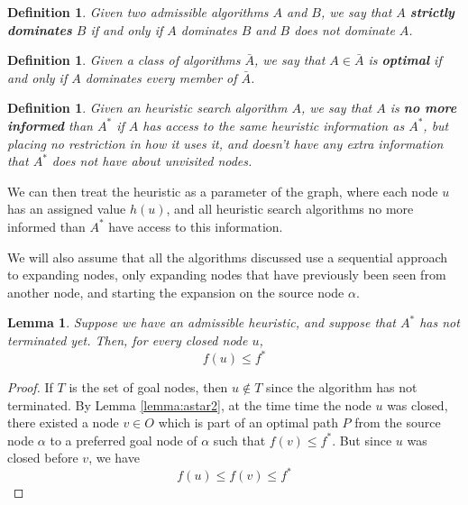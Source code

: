 \documentclass[12pt]{report}
\newtheorem{definition}[theorem]{Definition}
\newtheorem{lemma}[theorem]{Lemma}
\begin{document}
\begin{definition}
Given two admissible algorithms $A$ and $B$, we say that $A$ \textbf{strictly dominates} $B$ if and only if $A$ dominates $B$ and $B$ does not dominate $A$.
\end{definition}

\begin{definition}
Given a class of algorithms $\bar{A}$, we say that $A \in \bar{A}$ is \textbf{optimal} if and only if $A$ dominates every member of $\bar{A}$.
\end{definition}

\begin{definition}
Given an heuristic search algorithm $A$, we say that $A$ is \textbf{no more informed} than $A^*$ if $A$ has access to the same heuristic information as $A^*$, but placing no restriction in how it uses it, and doesn't have any extra information that $A^*$ does not have about unvisited nodes.
\end{definition}

We can then treat the heuristic as a parameter of the graph, where each node $u$ has an assigned value $h(u)$, and all heuristic search algorithms no more informed than $A^*$ have access to this information.

We will also assume that all the algorithms discussed use a sequential approach to expanding nodes, only expanding nodes that have previously been seen from another node, and starting the expansion on the source node $\alpha$.

\begin{lemma}
\label{lemma:astar-opt}
Suppose we have an admissible heuristic, and suppose that $A^*$ has not terminated yet. Then, for every closed node $u$,
\[ f(u) \leq f^* \]
\end{lemma}
\begin{proof}
If $T$ is the set of goal nodes, then $u \not \in T$ since the algorithm has not terminated. By Lemma \ref{lemma:astar2}, at the time time the node $u$ was closed, there existed a node $v \in O$ which is part of an optimal path $P$ from the source node $\alpha$ to a preferred goal node of $\alpha$ such that $f(v) \leq f^*$.
But since $u$ was closed before $v$, we have
\[ f(u) \leq f(v) \leq f^* \]
\end{proof}
\end{document}
